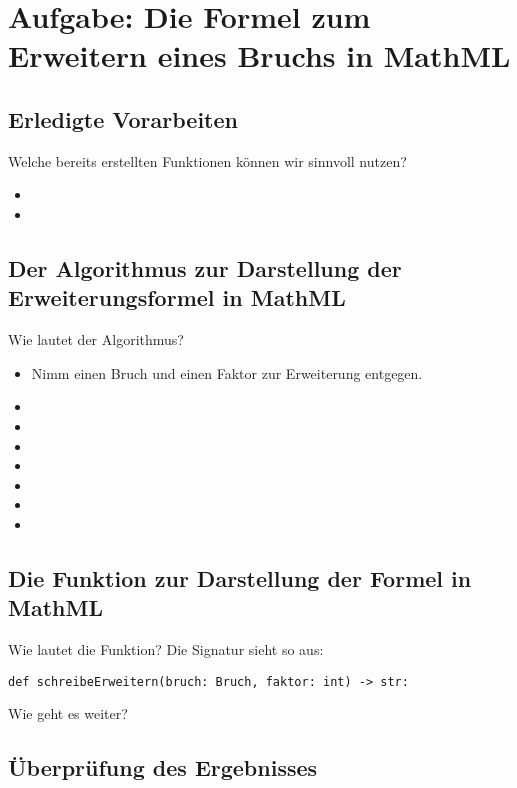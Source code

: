 \section{Aufgabe: Die Formel zum Erweitern eines Bruchs in MathML}

\subsection*{Erledigte Vorarbeiten}

Welche bereits erstellten Funktionen können wir sinnvoll nutzen?

\begin{itemize}[itemsep=2ex]
	\item 
	\item
\end{itemize}

\subsection*{Der Algorithmus zur Darstellung der Erweiterungsformel in MathML}

Wie lautet der Algorithmus?

\begin{itemize}[itemsep=5ex]
	\item Nimm einen Bruch und einen Faktor zur Erweiterung entgegen.
	\item 
	\item 
	\item 
	\item 
	\item 
	\item 
	\item 
\end{itemize}

\pagebreak

\subsection*{Die Funktion zur Darstellung der Formel in MathML}

Wie lautet die Funktion? Die Signatur sieht so aus:

\lstset{style=syntaxPython}
\begin{lstlisting}
def schreibeErweitern(bruch: Bruch, faktor: int) -> str:
\end{lstlisting}

Wie geht es weiter?

\subsection*{Überprüfung des Ergebnisses}

